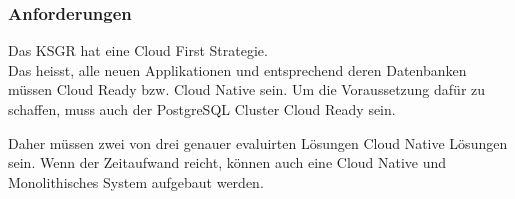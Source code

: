 
\subsubsection{Anforderungen}
\begin{flushleft}
    Das KSGR hat eine Cloud First Strategie.\\
    Das heisst, alle neuen Applikationen und entsprechend deren Datenbanken müssen Cloud Ready bzw.
    Cloud Native sein.
    Um die Voraussetzung dafür zu schaffen, muss auch der PostgreSQL Cluster Cloud Ready sein.
\end{flushleft}
\begin{flushleft}
    Daher müssen zwei von drei genauer evaluirten Lösungen Cloud Native Lösungen sein.
    Wenn der Zeitaufwand reicht, können auch eine Cloud Native und Monolithisches System aufgebaut werden.
\end{flushleft}
\begin{flushleft}
    \begin{landscape}
    
    \end{landscape}
\end{flushleft}
